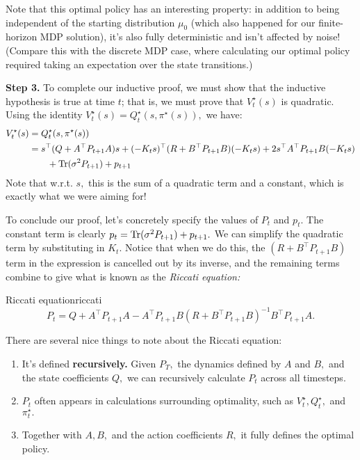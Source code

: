 \documentclass[../main/main]{subfiles}
\begin{document}
Note that this optimal policy has an interesting property: in addition to being
independent of the starting distribution $\mu_0$ (which also happened for our
finite-horizon MDP solution), it's also fully deterministic and isn't affected by noise!
(Compare this with the discrete MDP case, where calculating our optimal policy
required taking an expectation over the state transitions.)

\textbf{Step 3.} To complete our inductive proof, we must show that the
inductive hypothesis is true at time $t$; that is, we must prove that
$V^\star_t(s)$ is quadratic.
Using the identity $V^\star_t(s) = Q^\star_t(s, \pi^\star(s)),$ we have: \begin{align*}
    V^\star_t(s) &= Q^\star_t(s, \pi^\star(s)) \\
    &= s^\top (Q + A^\top P_{t+1} A) s + (-K_t s)^\top (R + B^\top P_{t+1} B) (-K_t s)
    + 2s^\top A^\top P_{t+1} B (-K_t s) \\
        &\qquad + \operatorname*{\textrm{Tr}}(\sigma^2 P_{t+1}) + p_{t+1}
\end{align*}
Note that w.r.t. $s,$ this is the sum of a quadratic term and a constant,
which is exactly what we were aiming for!

To conclude our proof, let's concretely specify the values of $P_t$ and $p_t.$
The constant term is clearly $p_t = \operatorname*{\textrm{Tr}}(\sigma^2 P_{t+1}) + p_{t+1}.$
We can simplify the quadratic term by substituting in $K_t.$
Notice that when we do this, the $(R+B^\top P_{t+1} B)$ term in
the expression is cancelled out by its inverse, and the remaining terms combine to give
what is known as the \emph{Riccati equation:}

\begin{theorem}{Riccati equation}{riccati}
    \[
        P_t = Q + A^\top P_{t+1} A - A^\top P_{t+1} B (R + B^\top P_{t+1} B)^{-1} B^\top P_{t+1} A.
    \]
\end{theorem}

There are several nice things to note about the Riccati equation:
\begin{enumerate}
    \item It's defined \textbf{recursively.} Given $P_T,$ the dynamics defined by $A$ and $B,$ and the state coefficients $Q,$ we can
    recursively calculate $P_t$ across all timesteps.
    \item $P_t$ often appears in calculations surrounding optimality, such as $V^\star_t, Q^\star_t,$ and $\pi^\star_t.$
    \item Together with $A, B,$ and the action coefficients $R,$ it fully defines the optimal policy.
\end{enumerate}
\end{document}
